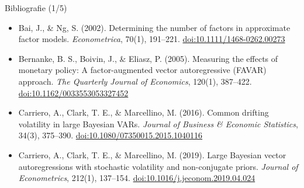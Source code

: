 \begin{frame}{Bibliografie (1/5)}
\begin{itemize}
    \item Bai, J., \& Ng, S. (2002). Determining the number of factors in approximate factor models. \textit{Econometrica}, 70(1), 191--221. \href{https://doi.org/10.1111/1468-0262.00273}{doi:10.1111/1468-0262.00273}
    \item Bernanke, B. S., Boivin, J., \& Eliasz, P. (2005). Measuring the effects of monetary policy: A factor-augmented vector autoregressive (FAVAR) approach. \textit{The Quarterly Journal of Economics}, 120(1), 387--422. \href{https://doi.org/10.1162/0033553053327452}{doi:10.1162/0033553053327452}
    \item Carriero, A., Clark, T. E., \& Marcellino, M. (2016). Common drifting volatility in large Bayesian VARs. \textit{Journal of Business \& Economic Statistics}, 34(3), 375--390. \href{https://doi.org/10.1080/07350015.2015.1040116}{doi:10.1080/07350015.2015.1040116}
    \item Carriero, A., Clark, T. E., \& Marcellino, M. (2019). Large Bayesian vector autoregressions with stochastic volatility and non-conjugate priors. \textit{Journal of Econometrics}, 212(1), 137--154. \href{https://doi.org/10.1016/j.jeconom.2019.04.024}{doi:10.1016/j.jeconom.2019.04.024}
\end{itemize}
\end{frame}

